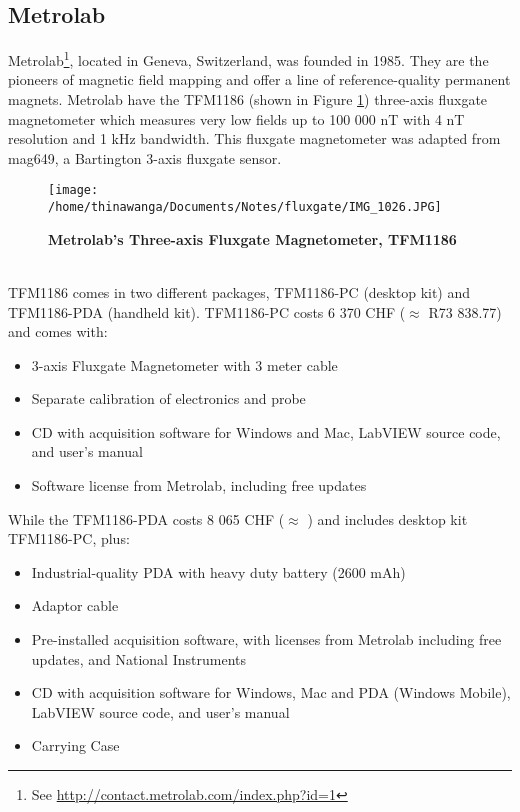 \documentclass[a4paper,10pt]{report}
\begin{document}
\subsection*{Metrolab}
Metrolab\footnote{See \url{http://contact.metrolab.com/index.php?id=1}}, located in
Geneva, Switzerland, was founded in 1985. They are the pioneers of magnetic field
mapping and offer a line of reference-quality permanent magnets. Metrolab have the
TFM1186 (shown in Figure \ref{TFM1186}) three-axis fluxgate magnetometer which
measures very low fields up to 100 000 nT with 4 nT resolution and
1 kHz bandwidth. This fluxgate magnetometer was adapted from mag649, a
Bartington 3-axis fluxgate sensor. 
\begin{figure}[!h]
\centering
\texttt{[image: /home/thinawanga/Documents/Notes/fluxgate/IMG\_1026.JPG]}
\caption{\textbf{Metrolab's Three-axis Fluxgate Magnetometer, TFM1186}}
\label{TFM1186}
\end{figure}\\
TFM1186 comes in two different packages, TFM1186-PC (desktop kit) and TFM1186-PDA
(handheld kit). TFM1186-PC costs 6 370 CHF ($\approx$ R73 838.77)
and comes with:
\begin{itemize}
 \item 3-axis Fluxgate Magnetometer with 3 meter cable
 \item Separate calibration of electronics and probe
 \item CD with acquisition software for Windows and Mac, LabVIEW source
  code, and user’s manual
 \item Software license from Metrolab, including free updates
\end{itemize}
While the TFM1186-PDA costs 8 065 CHF ($\approx$ ) and includes desktop kit TFM1186-PC,
plus:
\begin{itemize}
 \item Industrial-quality PDA with heavy duty battery (2600 mAh)
 \item Adaptor cable
 \item Pre-installed acquisition software, with licenses from
Metrolab including free updates, and National Instruments
 \item CD with acquisition software for Windows, Mac and PDA
(Windows Mobile), LabVIEW source code, and user’s
 manual
 \item Carrying Case
\end{itemize}
\end{document}
